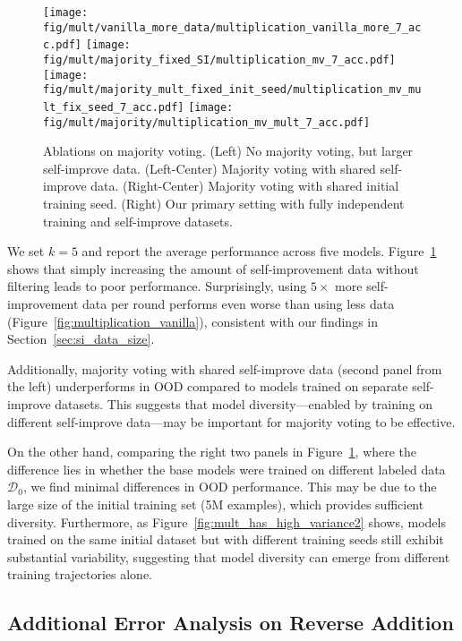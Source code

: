 \begin{figure}[ht!]
    \centering
    \texttt{[image: fig/mult/vanilla\_more\_data/multiplication\_vanilla\_more\_7\_acc.pdf]}
    \texttt{[image: fig/mult/majority\_fixed\_SI/multiplication\_mv\_7\_acc.pdf]}
    \texttt{[image: fig/mult/majority\_mult\_fixed\_init\_seed/multiplication\_mv\_mult\_fix\_seed\_7\_acc.pdf]}
    \texttt{[image: fig/mult/majority/multiplication\_mv\_mult\_7\_acc.pdf]}
    \caption{Ablations on majority voting. (Left) No majority voting, but larger self-improve data. (Left-Center) Majority voting with shared self-improve data. (Right-Center) Majority voting with shared initial training seed. (Right) Our primary setting with fully independent training and self-improve datasets.}
    \label{fig:mv_baseline}
\end{figure}



We set $k=5$ and report the average performance across five models. Figure~\ref{fig:mv_baseline} shows that simply increasing the amount of self-improvement data without filtering leads to poor performance. Surprisingly, using $5\times$ more self-improvement data per round performs even worse than using less data (Figure~\ref{fig:multiplication_vanilla}), consistent with our findings in Section~\ref{sec:si_data_size}.

Additionally, majority voting with shared self-improve data (second panel from the left) underperforms in OOD compared to models trained on separate self-improve datasets. This suggests that model diversity—enabled by training on different self-improve data—may be important for majority voting to be effective. 

On the other hand, comparing the right two panels in Figure~\ref{fig:mv_baseline}, where the difference lies in whether the base models were trained on different labeled data $\mathcal{D}_0$, we find minimal differences in OOD performance. This may be due to the large size of the initial training set (5M examples), which provides sufficient diversity. Furthermore, as Figure~\ref{fig:mult_has_high_variance2} shows, models trained on the same initial dataset but with different training seeds still exhibit substantial variability, suggesting that model diversity can emerge from different training trajectories alone.


\subsection{Additional Error Analysis on Reverse Addition}\label{sec:appdx_error_patterns}

